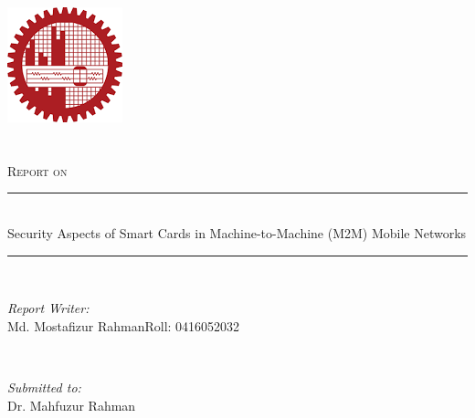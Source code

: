 \documentclass[12pt]{article}
\begin{document}
\begin{titlepage}

\newcommand{\HRule}{\rule{\linewidth}{0.5mm}} %

\center %


\includegraphics{logo.png}\\[.1cm] %


\\[1.5cm] %

\\[.8cm] %

%
\textsc{\Large Report on }\\[0.5cm] %

\HRule \\[0.4cm]
{ \huge  Security Aspects of Smart Cards in Machine-to-Machine (M2M) Mobile Networks}\\[0.4cm] %

\HRule \\[1cm]
 

\begin{minipage}{0.5\textwidth}
\begin{flushleft} \large
\emph{Report Writer:}\\
Md. Mostafizur Rahman\newline Roll: 0416052032 
\end{flushleft}
\end{minipage}
~
\begin{minipage}{0.4\textwidth}
\begin{flushright} \large
\emph{Submitted to:} \\
Dr. Mahfuzur  Rahman%
\end{flushright}
\end{minipage}\\[1cm]




\end{titlepage}
\end{document}
